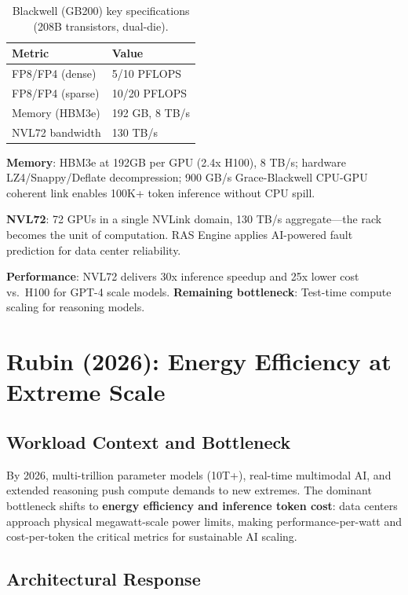\documentclass{article}
\begin{document}
\begin{table}[h]
\centering
\footnotesize
\begin{tabular}{ll}
\toprule
Metric & Value \\
\midrule
FP8/FP4 (dense) & 5/10 PFLOPS \\
FP8/FP4 (sparse) & 10/20 PFLOPS \\
Memory (HBM3e) & 192 GB, 8 TB/s \\
NVL72 bandwidth & 130 TB/s \\
\bottomrule
\end{tabular}
\caption{Blackwell (GB200) key specifications (208B transistors, dual-die).}
\end{table}

\textbf{Memory}: HBM3e at 192GB per GPU (2.4x H100), 8 TB/s; hardware LZ4/Snappy/Deflate decompression; 900 GB/s Grace-Blackwell CPU-GPU coherent link enables 100K+ token inference without CPU spill.

\textbf{NVL72}: 72 GPUs in a single NVLink domain, 130 TB/s aggregate---the rack becomes the unit of computation. RAS Engine applies AI-powered fault prediction for data center reliability.

\textbf{Performance}: NVL72 delivers 30x inference speedup and 25x lower cost vs.\ H100 for GPT-4 scale models. \textbf{Remaining bottleneck}: Test-time compute scaling for reasoning models.

\section{Rubin (2026): Energy Efficiency at Extreme Scale}

\subsection{Workload Context and Bottleneck}

By 2026, multi-trillion parameter models (10T+), real-time multimodal AI, and extended reasoning push compute demands to new extremes. The dominant bottleneck shifts to \textbf{energy efficiency and inference token cost}: data centers approach physical megawatt-scale power limits, making performance-per-watt and cost-per-token the critical metrics for sustainable AI scaling.

\subsection{Architectural Response}
\end{document}
